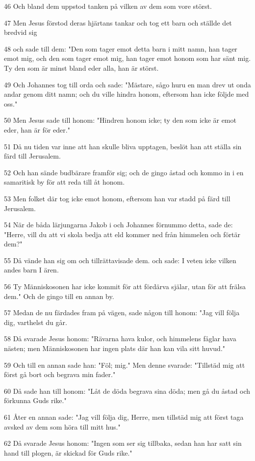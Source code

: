 \par 46 Och bland dem uppstod tanken på vilken av dem som vore störst.
\par 47 Men Jesus förstod deras hjärtans tankar och tog ett barn och ställde det bredvid sig
\par 48 och sade till dem: "Den som tager emot detta barn i mitt namn, han tager emot mig, och den som tager emot mig, han tager emot honom som har sänt mig. Ty den som är minst bland eder alla, han är störst.
\par 49 Och Johannes tog till orda och sade: "Mästare, sågo huru en man drev ut onda andar genom ditt namn; och du ville hindra honom, eftersom han icke följde med oss."
\par 50 Men Jesus sade till honom: "Hindren honom icke; ty den som icke är emot eder, han är för eder."
\par 51 Då nu tiden var inne att han skulle bliva upptagen, beslöt han att ställa sin färd till Jerusalem.
\par 52 Och han sände budbärare framför sig; och de gingo åstad och kommo in i en samaritisk by för att reda till åt honom.
\par 53 Men folket där tog icke emot honom, eftersom han var stadd på färd till Jerusalem.
\par 54 När de båda lärjungarna Jakob i och Johannes förnummo detta, sade de: "Herre, vill du att vi skola bedja att eld kommer ned från himmelen och förtär dem?"
\par 55 Då vände han sig om och tillrättavisade dem. och sade: I veten icke vilken andes barn I ären.
\par 56 Ty Människosonen har icke kommit för att fördärva själar, utan för att frälsa dem." Och de gingo till en annan by.
\par 57 Medan de nu färdades fram på vägen, sade någon till honom: "Jag vill följa dig, varthelst du går.
\par 58 Då svarade Jesus honom: "Rävarna hava kulor, och himmelens fåglar hava nästen; men Människosonen har ingen plats där han kan vila sitt huvud."
\par 59 Och till en annan sade han: "Föl; mig." Men denne svarade: "Tillstäd mig att först gå bort och begrava min fader."
\par 60 Då sade han till honom: "Låt de döda begrava sina döda; men gå du åstad och förkunna Guds rike."
\par 61 Åter en annan sade: "Jag vill följa dig, Herre, men tillstäd mig att först taga avsked av dem som höra till mitt hus."
\par 62 Då svarade Jesus honom: "Ingen som ser sig tillbaka, sedan han har satt sin hand till plogen, är skickad för Guds rike."

